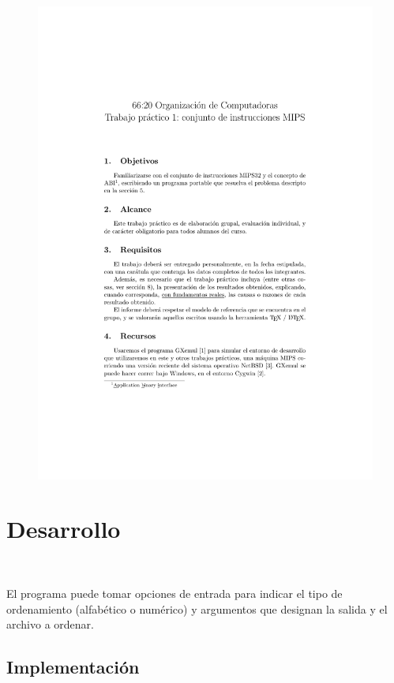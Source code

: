 \documentclass[a4paper, 12pt]{article}
\begin{document}
	\newpage
	\begin{figure}[H]
		\centering
		\includegraphics[scale=1, page = 5, clip, trim=1.5in 36mm 20mm 20mm]{files/enunciado.pdf}
	\end{figure}
	
	\section{Desarrollo}
	\
	
		El programa puede tomar opciones de entrada para indicar el tipo de ordenamiento (alfabético o numérico) y argumentos que designan la salida y el archivo a ordenar.
		
	\subsection{Implementación}
		
\end{document}
